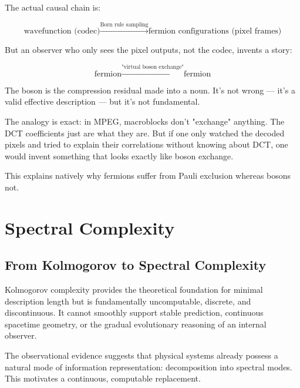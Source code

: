 \documentclass[11pt]{article}
\begin{document}
The actual causal chain is:

\[
\text{wavefunction (codec)} \xrightarrow{\text{Born rule sampling}} \text{fermion configurations (pixel frames)}
\]

But an observer who only sees the pixel outputs, not the codec, invents a story:

\[
\text{fermion} \xrightarrow{\text{"virtual boson exchange"}} \text{fermion}
\]

The boson is the compression residual made into a noun. It's not wrong — it's a valid effective description —
but it's not fundamental.

The analogy is exact: in MPEG, macroblocks don't "exchange" anything.
The DCT coefficients just are what they are. But if one only watched the decoded pixels
and tried to explain their correlations without knowing about DCT, one would invent something
that looks exactly like boson exchange.

This explains natively why fermions suffer from Pauli exclusion whereas bosons not.


\section{Spectral Complexity}
\label{sec:spectral}

\subsection{From Kolmogorov to Spectral Complexity}

Kolmogorov complexity provides the theoretical foundation for minimal
description length but is fundamentally uncomputable, discrete, and
discontinuous. It cannot smoothly support stable prediction, continuous
spacetime geometry, or the gradual evolutionary reasoning of an internal
observer.

The observational evidence suggests that physical systems already possess
a natural mode of information representation: decomposition into spectral
modes. This motivates a continuous, computable replacement.
\end{document}
